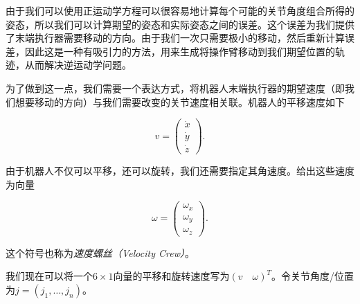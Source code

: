 由于我们可以使用正运动学方程可以很容易地计算每个可能的关节角度组合所得的姿态，所以我们可以计算期望的姿态和实际姿态之间的误差。这个误差为我们提供了末端执行器需要移动的方向。由于我们一次只需要极小的移动，然后重新计算误差，因此这是一种有吸引力的方法，用来生成将操作臂移动到我们期望位置的轨迹，从而解决逆运动学问题。



为了做到这一点，我们需要一个表达方式，将机器人末端执行器的期望速度（即我们想要移动的方向）与我们需要改变的关节速度相关联。机器人的平移速度如下

\begin{equation}
v=\left(\begin{array}{c}
\dot{x}\\
\dot{y}\\
\dot{z}
\end{array}
\right).
\end{equation}


由于机器人不仅可以平移，还可以旋转，我们还需要指定其角速度。给出这些速度为向量

\begin{equation}
\omega=\left(\begin{array}{c}
\omega_x\\
\omega_y\\
\omega_z
\end{array}
\right).
\end{equation}


这个符号也称为\emph{速度螺丝（Velocity Crew）}。


我们现在可以将一个$6\times 1$向量的平移和旋转速度写为$(v\quad \omega)^T$。令关节角度/位置为$ j=(j_1,\ldots,j_n)$。

